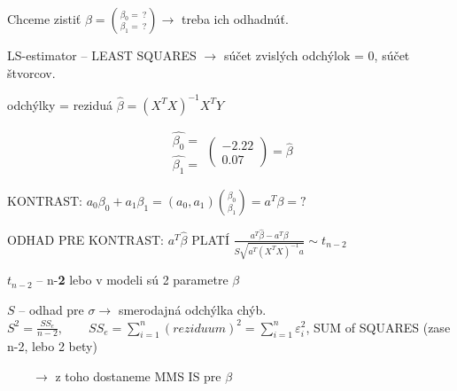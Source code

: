 \documentclass[unknownkeysallowed]{article}
\begin{document}
Chceme zistiť $\beta = \binom{\beta_0 = ~?}{\beta_1 = ~?} \to$ treba ich odhadnúť.

LS-estimator -- LEAST SQUARES $\to$ súčet zvislých odchýlok = 0, súčet štvorcov.

odchýlky = reziduá \qquad $\hat{\beta} = (X^TX)^{-1}X^TY$

$$
\begin{matrix}
  \hat{\beta_0} =\\
  \hat{\beta_1} =
 \end{matrix} 
\left(\begin{matrix}
  -2.22\\
  0.07
 \end{matrix}\right)
 = \hat{\beta}
$$

KONTRAST: $a_0\beta_0 + a_1\beta_1 = (a_0, a_1)\binom{\beta_0}{\beta_1} = a^T\beta = ?$

ODHAD PRE KONTRAST: $a^T\hat{\beta}$ \qquad PLATÍ $\frac{a^T\hat{\beta} - a^T\beta}{S\sqrt{a^T(X^TX)^{-1}a}} \sim t_{n-2}$

$t_{n-2}$ -- n-\textbf{2} lebo v modeli sú 2 parametre $\beta$

$S$ -- odhad pre $\sigma \to$ smerodajná odchýlka chýb. $S^2 = \frac{SS_e}{n-2}, \qquad SS_e = \sum_{i=1}^n(reziduum)^2 = \sum_{i=1}^n \varepsilon_i^2$, SUM of SQUARES (zase n-2, lebo 2 bety)

$\qquad \to$ z toho dostaneme MMS IS pre $\beta$

\vspace{20mm}
\end{document}
